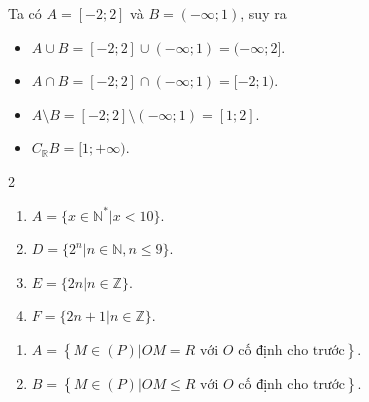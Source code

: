 \begin{loigiaibt}{6}
  Ta có $A=[-2;2]$ và $B=(-\infty ;1)$, suy ra \begin {itemize} \item $A\cup B=[-2;2]\cup (-\infty ;1)=(-\infty ;2]$. \item $A\cap B=[-2;2]\cap (-\infty ;1)=[-2;1)$. \item $A\setminus B=[-2;2]\setminus (-\infty ;1)=[1;2]$. \item $C_{\mathbb {R}}B=[1;+\infty )$. \end {itemize}  
\end{loigiaibt}
\begin{loigiaibt}{7}
  \begin {multicols}{2} \begin {enumerate} \item $ A=\{x \in \mathbb {N^*} | x<10\} $. \item $ D=\{2^n | n \in \mathbb {N}, n \le 9 \} $. \item $ E=\{2n | n \in \mathbb {Z}\} $. \item $ F=\{2n+1 | n \in \mathbb {Z}\} $. \end {enumerate} \end {multicols}  
\end{loigiaibt}
\begin{loigiaibt}{8}
  \begin {enumerate} \item $A=\left \{M\in (P)\big | OM=R \text { với } O \text { cố định cho trước}\right \}$. \item $B=\left \{M\in (P)\big | OM\leqslant R\text { với } O \text { cố định cho trước}\right \}$. \end {enumerate}  
\end{loigiaibt}
